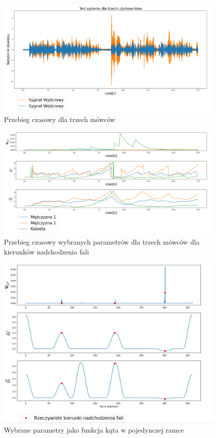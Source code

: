 \begin{figure}[h!]
    \centering
    \includegraphics[width=\textwidth]{Images/multi_user.png}
    \caption{Przebieg czasowy dla trzech mówców}
    \label{fig:multi_user}
\end{figure}

\begin{figure}[h!]
    \centering
    \includegraphics[width=\textwidth]{Images/multi_user_params_in_time.png}
    \caption{Przebieg czasowy wybranych parametrów dla trzech mówców dla kierunków nadchodzenia fali}
    \label{fig:multi_user_params_in_time}
\end{figure}

\begin{figure}[h!]
    \centering
    \includegraphics[width=\textwidth]{Images/multi_user_params_in_angle.png}
    \caption{Wybrane parametry jako funkcja kąta w pojedynczej ramce}
    \label{fig:multi_user_params_in_angle}
\end{figure}

